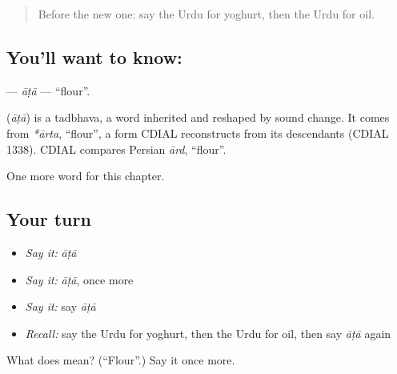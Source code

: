 \label{lesson:UR-C117-ata}



\begin{quote}
Before the new one: say the Urdu for yoghurt, then the Urdu for oil.
\end{quote}

\subsection*{You'll want to know: }
\textbf{} — \emph{āṭā} — \textquotedblleft{}flour\textquotedblright{}.

\begin{cousinweb}
\textbf{} (\emph{āṭā}) is a tadbhava, a word inherited and reshaped by sound change. It comes from \emph{*ārta}, \textquotedblleft{}flour\textquotedblright{}, a form CDIAL reconstructs from its descendants (CDIAL 1338). CDIAL compares Persian \emph{ārd}, \textquotedblleft{}flour\textquotedblright{}.
\end{cousinweb}

\begin{grammarlens}[title={What you've built}]
One more word for this chapter.
\end{grammarlens}

\subsection*{Your turn}
\begin{itemize}
\raggedright
  \item \emph{Say it:} \emph{āṭā}
  \item \emph{Say it:} \emph{āṭā}, once more
  \item \emph{Say it:} say \emph{āṭā}
  \item \emph{Recall:} say the Urdu for yoghurt, then the Urdu for oil, then say \emph{āṭā} again
\end{itemize}

\begin{tcolorbox}[breakable,colback=teal!4,colframe=teal!35!black,title={Before you move on}]
What does  mean? (\textquotedblleft{}Flour\textquotedblright{}.) Say it once more.
\end{tcolorbox}
